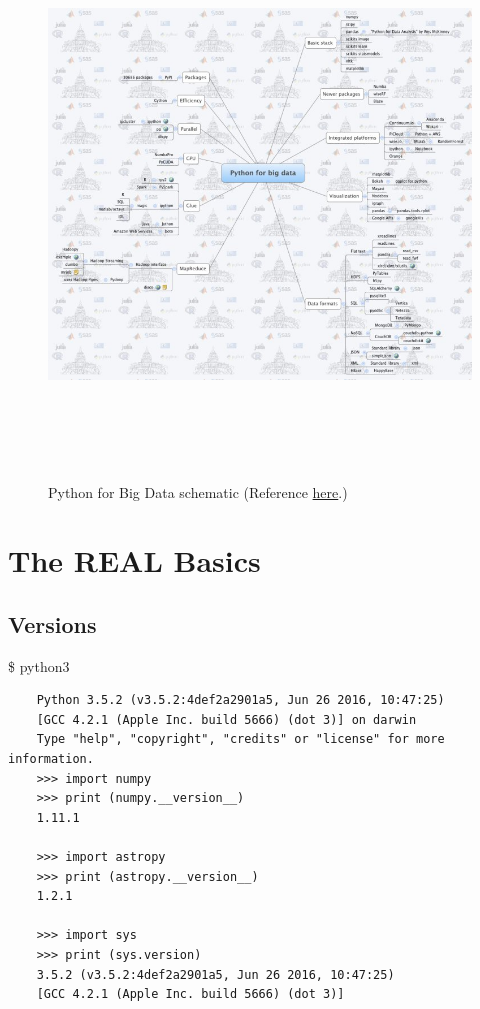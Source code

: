 \documentclass[11pt,a4paper]{article}
\begin{document}
\begin{figure}
  \begin{center}
  \includegraphics[height=15.0cm,width=15.0cm]
  {Python_forBigData_schematic.jpg}
  \caption[]
  {Python for Big Data schematic 
    (Reference 
    \href{https://pbs.twimg.com/media/C7I9w4hX4AAVRK3.jpg}{here}.) 
  }
  \label{fig:fig0}
  \end{center}
\end{figure}




\newpage

\section{The REAL Basics}

    \subsection{Versions}
    \$ python3
    \begin{lstlisting}
    Python 3.5.2 (v3.5.2:4def2a2901a5, Jun 26 2016, 10:47:25) 
    [GCC 4.2.1 (Apple Inc. build 5666) (dot 3)] on darwin
    Type "help", "copyright", "credits" or "license" for more information.
    >>> import numpy 
    >>> print (numpy.__version__)
    1.11.1 

    >>> import astropy 
    >>> print (astropy.__version__)
    1.2.1 
 
    >>> import sys
    >>> print (sys.version)
    3.5.2 (v3.5.2:4def2a2901a5, Jun 26 2016, 10:47:25) 
    [GCC 4.2.1 (Apple Inc. build 5666) (dot 3)]

    \end{lstlisting}
 
\end{document}

